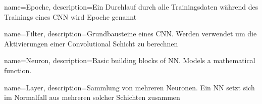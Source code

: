 

{
  name={Epoche},
  description={Ein Durchlauf durch alle Trainingsdaten während des Trainings eines CNN wird Epoche genannt}
}

{
  name={Filter},
  description={Grundbausteine eines CNN. Werden verwendet um die Aktivierungen einer Convolutional Schicht zu berechnen}
}

{
  name={Neuron},
  description={Basic building blocks of NN. Models a mathematical function.}
}

{
  name={Layer},
  description={Sammlung von mehreren Neuronen. Ein NN setzt sich im Normalfall aus mehreren solcher Schichten zusammen}
}


